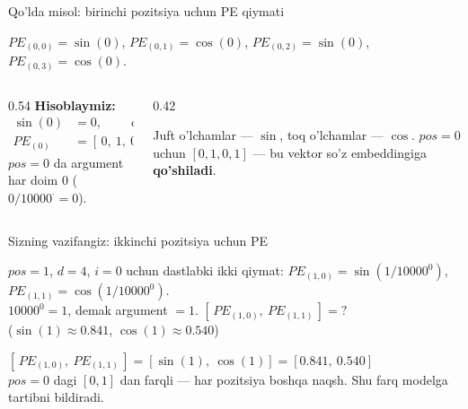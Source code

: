 \documentclass[aspectratio=169,11pt]{beamer}
\begin{document}
\begin{frame}{Qo'lda misol: birinchi pozitsiya uchun PE qiymati}
  \begin{tcolorbox}[defbox,title={Positional encoding, $pos=0$, $d=4$}]
    \small $PE_{(0,0)}=\sin(0)$, \; $PE_{(0,1)}=\cos(0)$, \;
    $PE_{(0,2)}=\sin(0)$, \; $PE_{(0,3)}=\cos(0)$.
  \end{tcolorbox}
  \vspace{0.2em}
  \begin{columns}[T]
    \begin{column}{0.54\textwidth}
      \textbf{Hisoblaymiz:}
      \begin{align*}
        \sin(0) &= 0, \qquad \cos(0) = 1\\
        PE_{(0)} &= [\,0,\ 1,\ 0,\ 1\,]
      \end{align*}
      \footnotesize $pos=0$ da argument har doim $0$ ($0/10000^{\cdot}=0$).
    \end{column}
    \begin{column}{0.42\textwidth}
      \begin{tcolorbox}[okbox,top=2pt,bottom=2pt]
        \footnotesize
        Juft o'lchamlar --- $\sin$, toq o'lchamlar --- $\cos$. $pos=0$ uchun
        $[0,1,0,1]$ --- bu vektor so'z embeddingiga \textbf{qo'shiladi}.
      \end{tcolorbox}
    \end{column}
  \end{columns}
\end{frame}

\begin{frame}{Sizning vazifangiz: ikkinchi pozitsiya uchun PE}
  \begin{tcolorbox}[warnbox,title=Savol --- 60 soniya]
    \small
    $pos=1$, $d=4$, $i=0$ uchun dastlabki ikki qiymat:
    $PE_{(1,0)}=\sin(1/10000^{0})$, $PE_{(1,1)}=\cos(1/10000^{0})$.\\[4pt]
    $10000^{0}=1$, demak argument $=1$. \quad
    \textbf{\large $[\,PE_{(1,0)},\ PE_{(1,1)}\,] = ?$}\\[2pt]
    \footnotesize ($\sin(1)\approx 0.841$, \; $\cos(1)\approx 0.540$)
  \end{tcolorbox}
  \pause
  \begin{tcolorbox}[okbox,title=Javob]
    \small
    $[\,PE_{(1,0)},\ PE_{(1,1)}\,] = [\sin(1),\ \cos(1)] = \mathbf{[0.841,\ 0.540]}$\\[3pt]
    \footnotesize $pos=0$ dagi $[0,1]$ dan farqli --- har pozitsiya boshqa
    naqsh. Shu farq modelga tartibni bildiradi.
  \end{tcolorbox}
\end{frame}
\end{document}
